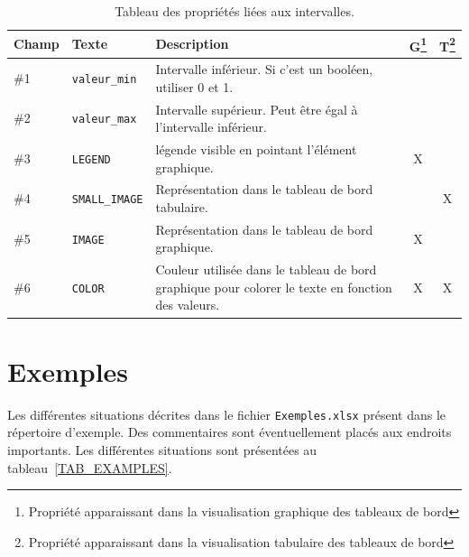 \documentclass{AlstomLibrary}
\newcommand{\INTERVLEGEND}{\index{Propriétés d'intervalle!LEGEND}\texttt{LEGEND}}
\begin{document}
\begin{table}\centering
\begin{tabular}{@{}llp{7cm}cc}  \toprule%
Champ & Texte & Description & G\footnote{Propriété apparaissant dans la visualisation graphique des tableaux de bord} & T\footnote{Propriété apparaissant dans la visualisation tabulaire des tableaux de bord} \\
\midrule
\#1 & \texttt{valeur\_min}  & Intervalle inférieur. Si c'est un booléen, utiliser 0 et 1. & & \\
\#2 & \texttt{valeur\_max}  & Intervalle supérieur. Peut être égal à l'intervalle inférieur. & & \\
\#3 & \INTERVLEGEND  & légende visible en pointant l'élément graphique. & X & \\
\#4 & \texttt{SMALL\_IMAGE}  & Représentation dans le tableau de bord tabulaire. & & X \\
\#5 & \texttt{IMAGE} &  Représentation dans le tableau de bord graphique. & X & \\
\#6 & \texttt{COLOR} &  Couleur utilisée dans le tableau de bord graphique pour colorer le texte en fonction des valeurs. & X & X \\
\bottomrule
\end{tabular}
\caption{Tableau des propriétés liées aux intervalles.}\label{TAB_PROPS_INTERVAL}
\end{table}

\chapter{Exemples}

Les différentes situations décrites dans le fichier \texttt{Exemples.xlsx} présent dans le répertoire d'exemple. Des commentaires sont éventuellement placés aux endroits importants. Les différentes situations sont présentées au tableau~\vref{TAB_EXAMPLES}.
\end{document}
